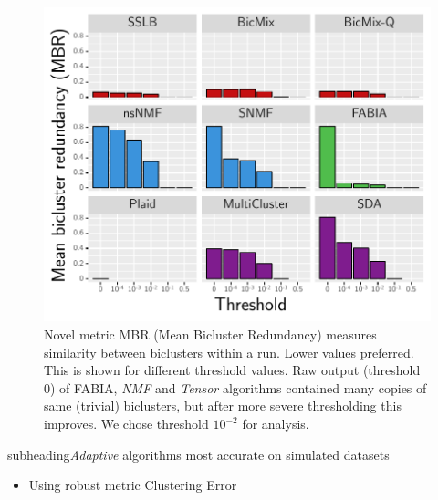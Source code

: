 \documentclass[xcolor=table,final]{beamer}
\newlength{\onecolwid}
\newlength{\twocolwid}
\newcommand{\kcnsubheading}[1]{\begin{beamercolorbox}[rounded=true,sep=0.5ex]{subheading}{\large #1}\end{beamercolorbox}}
\begin{document}
\begin{frame}[t]
\begin{columns}[t]
\begin{column}{\twocolwid}
\begin{columns}[t]
\begin{column}{\onecolwid}
\begin{figure}
\includegraphics[width=\textwidth]{plots/threshold_adjusted_redundancy_mean.pdf}
\caption{Novel metric MBR (Mean Bicluster Redundancy) measures similarity between biclusters within a run. Lower values preferred. This is shown for different threshold values. Raw output (threshold 0) of FABIA, \textit{NMF} and \textit{Tensor} algorithms contained many copies of same (trivial) biclusters, but after more severe thresholding this improves. We chose threshold $10^{-2}$ for analysis.}
\end{figure}

\kcnsubheading{\textit{Adaptive} algorithms most accurate on simulated datasets}

\begin{itemize}
    \item Using robust metric Clustering Error \cite{horta_similarity_2014}
\end{itemize}


\end{column}
\end{columns}
\end{column}
\end{columns}
\end{frame}
\end{document}
